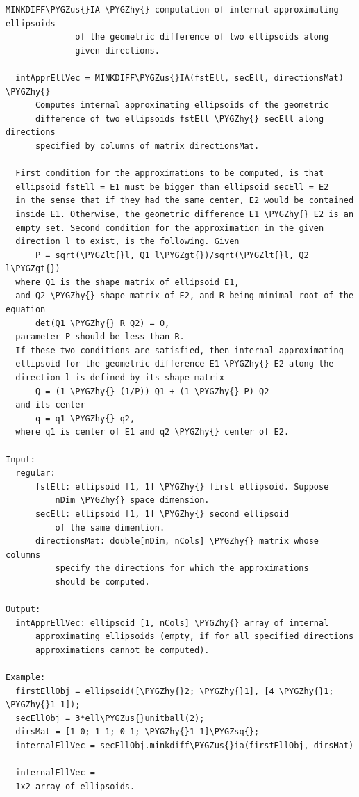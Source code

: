 \documentclass[letterpaper,10pt,english]{sphinxmanual}
\def\PYGZus{\char`\_}
\def\PYGZlt{\char`\<}
\def\PYGZgt{\char`\>}
\def\PYGZhy{\char`\-}
\def\PYGZsq{\char`\'}
\begin{document}
\begin{Verbatim}[commandchars=\\\{\}]
MINKDIFF\PYGZus{}IA \PYGZhy{} computation of internal approximating ellipsoids
              of the geometric difference of two ellipsoids along
              given directions.

  intApprEllVec = MINKDIFF\PYGZus{}IA(fstEll, secEll, directionsMat) \PYGZhy{}
      Computes internal approximating ellipsoids of the geometric
      difference of two ellipsoids fstEll \PYGZhy{} secEll along directions
      specified by columns of matrix directionsMat.

  First condition for the approximations to be computed, is that
  ellipsoid fstEll = E1 must be bigger than ellipsoid secEll = E2
  in the sense that if they had the same center, E2 would be contained
  inside E1. Otherwise, the geometric difference E1 \PYGZhy{} E2 is an
  empty set. Second condition for the approximation in the given
  direction l to exist, is the following. Given
      P = sqrt(\PYGZlt{}l, Q1 l\PYGZgt{})/sqrt(\PYGZlt{}l, Q2 l\PYGZgt{})
  where Q1 is the shape matrix of ellipsoid E1,
  and Q2 \PYGZhy{} shape matrix of E2, and R being minimal root of the equation
      det(Q1 \PYGZhy{} R Q2) = 0,
  parameter P should be less than R.
  If these two conditions are satisfied, then internal approximating
  ellipsoid for the geometric difference E1 \PYGZhy{} E2 along the
  direction l is defined by its shape matrix
      Q = (1 \PYGZhy{} (1/P)) Q1 + (1 \PYGZhy{} P) Q2
  and its center
      q = q1 \PYGZhy{} q2,
  where q1 is center of E1 and q2 \PYGZhy{} center of E2.

Input:
  regular:
      fstEll: ellipsoid [1, 1] \PYGZhy{} first ellipsoid. Suppose
          nDim \PYGZhy{} space dimension.
      secEll: ellipsoid [1, 1] \PYGZhy{} second ellipsoid
          of the same dimention.
      directionsMat: double[nDim, nCols] \PYGZhy{} matrix whose columns
          specify the directions for which the approximations
          should be computed.

Output:
  intApprEllVec: ellipsoid [1, nCols] \PYGZhy{} array of internal
      approximating ellipsoids (empty, if for all specified directions
      approximations cannot be computed).

Example:
  firstEllObj = ellipsoid([\PYGZhy{}2; \PYGZhy{}1], [4 \PYGZhy{}1; \PYGZhy{}1 1]);
  secEllObj = 3*ell\PYGZus{}unitball(2);
  dirsMat = [1 0; 1 1; 0 1; \PYGZhy{}1 1]\PYGZsq{};
  internalEllVec = secEllObj.minkdiff\PYGZus{}ia(firstEllObj, dirsMat)

  internalEllVec =
  1x2 array of ellipsoids.
\end{Verbatim}
\end{document}

